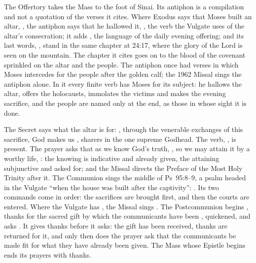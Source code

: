 The Offertory takes the Mass to the foot of Sinai. Its antiphon is a
compilation and not a quotation of the verses it cites. Where Exodus says that
Moses built an altar, , the antiphon says that he hallowed
it, , the verb the Vulgate uses of the altar's
consecration; it adds , the
language of the daily evening offering; and its last words, , stand in the same chapter at 24:17, where the glory of the
Lord is seen on the mountain. The chapter it cites goes on to the blood of the
covenant sprinkled on the altar and the people. The antiphon once had verses in
which Moses intercedes for the people after the golden calf; the 1962 Missal
sings the antiphon alone. In it every finite verb has Moses for its subject: he
hallows the altar, offers the holocausts, immolates the victims and makes the
evening sacrifice, and the people are named only at the end, as those in whose
sight it is done.

The Secret says what the altar is for: , through the venerable exchanges of this sacrifice, God makes us
, sharers in the one supreme
Godhead. The verb, , is present. The prayer asks that as we know
God's truth, , so we may attain it by a worthy life,
: the knowing is indicative and already given, the attaining
subjunctive and asked for; and the Missal directs the Preface of the Most Holy Trinity
after it. The Communion sings the middle of Ps~95:8--9, a psalm headed in the
Vulgate ``when the house was built after the captivity'': . Its two commands come in order: the
sacrifices are brought first, and then the courts are entered. Where the
Vulgate has , the Missal sings . The Postcommunion begins ,
thanks for the sacred gift by which the communicants have been
, quickened, and asks . It gives thanks before it asks: the gift has been received, thanks
are returned for it, and only then does the prayer ask that the communicants be
made fit for what they have already been given. The Mass whose Epistle begins
 ends its prayers with thanks.

